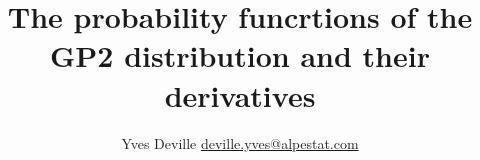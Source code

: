 \documentclass[11pt]{article}
\title{The probability funcrtions of the GP2 distribution and their
  derivatives}
\author{Yves Deville \href{mailto:deville.yves@alpestat.com}%
  {deville.yves@alpestat.com} }
\begin{document}
\maketitle{}
\tableofcontents{}

\end{document}
